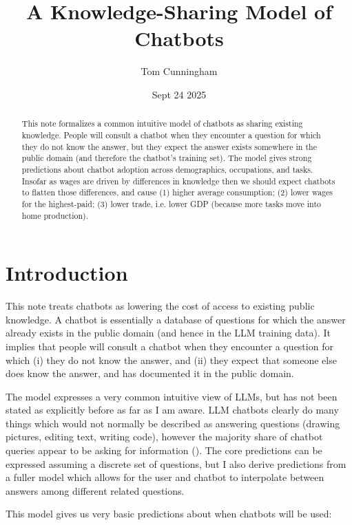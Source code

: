 \documentclass[\ifdraft draft\fi]{article}
\title{A Knowledge-Sharing Model of Chatbots}
\author{Tom Cunningham}
\date{Sept 24 2025}
\begin{document}
\maketitle
\begin{abstract}
   This note formalizes a common intuitive model of chatbots as sharing existing knowledge. People will consult a chatbot when they encounter a question for which they do not know the answer, but they expect the answer exists somewhere in the public domain (and therefore the chatbot's training set). The model gives strong predictions about chatbot adoption across demographics, occupations, and tasks.  Insofar as wages are driven by differences in knowledge then we should expect chatbots to flatten those differences, and cause (1) higher average consumption; (2) lower wages for the highest-paid; (3) lower trade, i.e. lower GDP (because more tasks move into home production).
\end{abstract}

\section{Introduction}

   This note treats chatbots as lowering the cost of access to existing public knowledge. A chatbot is essentially a database of questions for which the answer already exists in the public domain (and hence in the LLM training data). It implies that people will consult a chatbot when they encounter a question for which (i) they do not know the answer, and (ii) they expect that someone else does know the answer, and has documented it in the public domain. 
   
   The model expresses a very common intuitive view of LLMs, but has not been stated as explicitly before as far as I am aware. LLM chatbots clearly do many things which would not normally be described as answering questions (drawing pictures, editing text, writing code), however the majority share of chatbot queries appear to be asking for information (\citet{chatterji2025chatgpt}). The core predictions can be expressed assuming a discrete set of questions, but I also derive predictions from a fuller model which allows for the user and chatbot to interpolate between answers among different related questions.
   
   This model gives us very basic predictions about when chatbots will be used:
\end{document}
